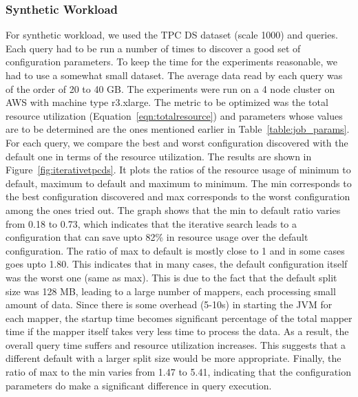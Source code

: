 \subsubsection*{Synthetic Workload}
For synthetic workload, we used the TPC DS dataset (scale 1000) and queries. Each query had to be run a number of times to discover a good set of configuration parameters. To keep the time for the experiments reasonable, we had to use a somewhat small dataset. The average data read by each query was of the order of 20 to 40 GB. The experiments were run on a 4 node cluster on AWS with machine type r3.xlarge. The metric to be optimized was the total resource utilization (Equation~\ref{eqn:totalresource}) and parameters whose values are to be determined are the ones mentioned earlier in Table~\ref{table:job_params}. For each query, we compare the best and worst configuration discovered with the default one in terms of the resource utilization. The results are shown in Figure~\ref{fig:iterativetpcds}. It plots the ratios of the resource usage of minimum to default, maximum to default and maximum to minimum. The min corresponds to the best configuration discovered and max corresponds to the worst configuration among the ones tried out. The graph shows that the min to default ratio varies from 0.18 to 0.73, which indicates that the iterative search leads to a configuration that can save upto 82\% in resource usage over the default configuration. The ratio of max to default is mostly close to 1 and in some cases goes upto 1.80. This indicates that in many cases, the default configuration itself was the worst one (same as max). This is due to the fact that the default split size was 128 MB, leading to a large number of mappers, each processing small amount of data. Since there is some overhead (5-10s) in starting the JVM for each mapper, the startup time becomes significant percentage of the total mapper time if the mapper itself takes very less time to process the data. As a result, the overall query time suffers and resource utilization increases. This suggests that a different default with a larger split size would be more appropriate. Finally, the ratio of max to the min varies from 1.47 to 5.41, indicating that the configuration parameters do make a significant difference in query execution. 
